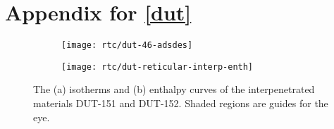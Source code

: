 
\graphicspath{ {\thisch/figures/} }

\chapter{Appendix for \autoref{dut}}%
\label{appx:dut}

\begin{figure}[htb]
    \centering
    \begin{subfigure}{0.5\linewidth}
        \texttt{[image: rtc/dut-46-adsdes]}%
        \caption{}\label{appx:dut:fgr:dut-46-adsdes}
    \end{subfigure}%
    \begin{subfigure}{0.5\linewidth}
        \texttt{[image: rtc/dut-reticular-interp-enth]}%
        \caption{}\label{appx:dut:fgr:dut-reticular-interp-log}
    \end{subfigure}%
    \caption{The (a) isotherms and (b) enthalpy curves of the
    interpenetrated materials DUT-151 and DUT-152. Shaded regions
    are guides for the eye.}%
    \label{appx:dut:fgr:butane-extra}
\end{figure}



